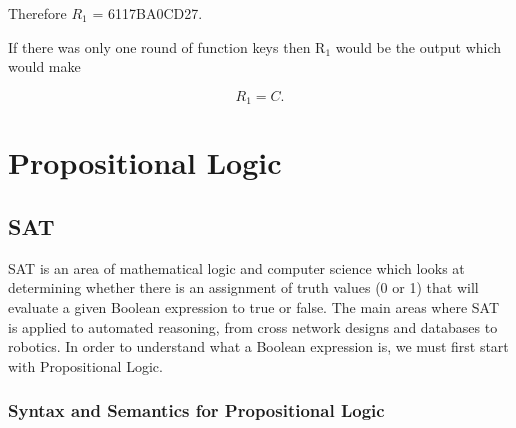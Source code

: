 \documentclass[11pt,a4paper, notitlepage]{report}
\begin{document}
Therefore $R_{1}$ = 6117BA0CD27.

If there was only one round of function keys then R$_{1}$ would be the output which would make

\begin{displaymath}
R_{1} = C.
\end{displaymath}















\chapter{Propositional Logic}
\label{cha:prelim}

\section{SAT}
\label{sec:SAT}
SAT is an area of mathematical logic and computer science which looks at determining whether there is an assignment of truth values (0 or 1) that will evaluate a given Boolean expression to true or false. The main areas where SAT is applied to automated reasoning, from cross network designs and databases to robotics. In order to understand what a Boolean expression is, we must first start with Propositional Logic. 


\subsection{Syntax and Semantics for Propositional Logic}
\label{sec:syntaxsem}
\end{document}
